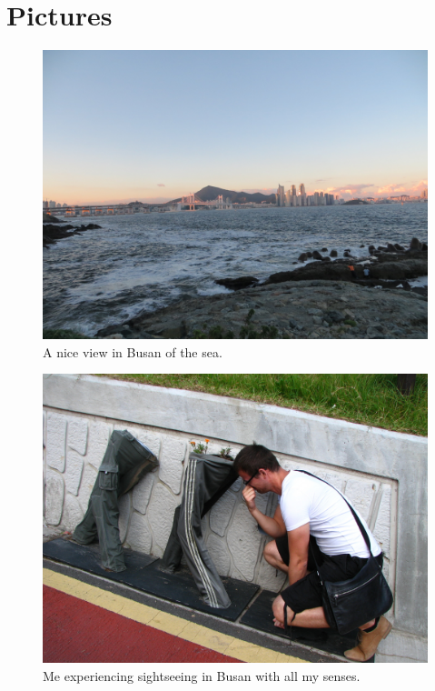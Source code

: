 \section*{Pictures}
\begin{figure}[h]
	\begin{center}
		\includegraphics*[width=\columnwidth]{photo1.jpg}
	\end{center}
	\caption{A nice view in Busan of the sea.}
	\label{fig:photo1}
\end{figure}
\begin{figure}[]
	\begin{center}
		\includegraphics*[width=\columnwidth]{photo3.jpg}
	\end{center}
	\caption{Me experiencing sightseeing in Busan with all my senses.}
	\label{fig:photo1}
\end{figure}
